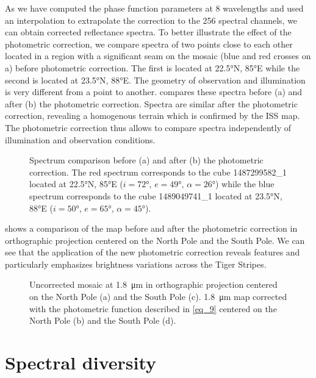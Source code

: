 \documentclass{arxiv-icarus}
\begin{document}
As we have computed the phase function parameters at 8 wavelengths and used an interpolation to extrapolate the correction to the 256 spectral channels, we can obtain corrected reflectance spectra. To better illustrate the effect of the photometric correction, we compare spectra of two points close to each other located in a region with a significant seam on the mosaic (blue and red crosses on a) before photometric correction. The first is located at \ang{22.5}N, \ang{85}E while the second is located at \ang{23.5}N, \ang{88}E. The geometry of observation and illumination is very different from a point to another.  compares these spectra before (a) and after (b) the photometric correction. Spectra are similar after the photometric correction, revealing a homogenous terrain which is confirmed by the ISS map. The photometric correction thus allows to compare spectra independently of illumination and observation conditions.

\begin{figure}[!ht]
    \caption{Spectrum comparison before (a) and after (b) the photometric correction. The red spectrum corresponds to the cube 1487299582\_1 located at \ang{22.5}N, \ang{85}E ($i = \ang{72}$, $e = \ang{49}$, $\alpha = \ang{26}$) while the blue spectrum corresponds to the cube 1489049741\_1 located at \ang{23.5}N, \ang{88}E ($i = \ang{50}$, $e = \ang{65}$, $\alpha = \ang{45}$).}
    \label{fig:fig_8}
\end{figure}

 shows a comparison of the map before and after the photometric correction in orthographic projection centered on the North Pole and the South Pole. We can see that the application of the new photometric correction reveals features and particularly emphasizes brightness variations across the Tiger Stripes.

\begin{figure}[!ht]
    \caption{Uncorrected mosaic at \SI{1.8}{\um} in orthographic projection centered on the North Pole (a) and the South Pole (c). \SI{1.8}{\um} map corrected with the photometric function described in \eqref{eq_9} centered on the North Pole (b) and the South Pole (d).}
    \label{fig:fig_9}
\end{figure}


\section{Spectral diversity}\label{sec:sec_4}
\end{document}
